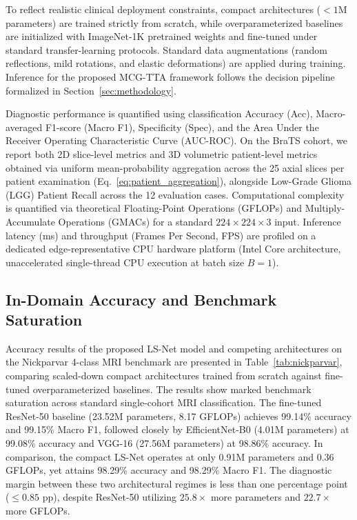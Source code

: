 To reflect realistic clinical deployment constraints, compact architectures ($<1$M parameters) are trained strictly from scratch, while overparameterized baselines are initialized with ImageNet-1K pretrained weights and fine-tuned under standard transfer-learning protocols. Standard data augmentations (random reflections, mild rotations, and elastic deformations) are applied during training. Inference for the proposed MCG-TTA framework follows the decision pipeline formalized in Section~\ref{sec:methodology}.

Diagnostic performance is quantified using classification Accuracy (Acc), Macro-averaged F1-score (Macro F1), Specificity (Spec), and the Area Under the Receiver Operating Characteristic Curve (AUC-ROC). On the BraTS cohort, we report both 2D slice-level metrics and 3D volumetric patient-level metrics obtained via uniform mean-probability aggregation across the 25 axial slices per patient examination (Eq.~\ref{eq:patient_aggregation}), alongside Low-Grade Glioma (LGG) Patient Recall across the 12 evaluation cases. Computational complexity is quantified via theoretical Floating-Point Operations (GFLOPs) and Multiply-Accumulate Operations (GMACs) for a standard $224 \times 224 \times 3$ input. Inference latency (ms) and throughput (Frames Per Second, FPS) are profiled on a dedicated edge-representative CPU hardware platform (Intel Core architecture, unaccelerated single-thread CPU execution at batch size $B=1$).

\subsection{In-Domain Accuracy and Benchmark Saturation}

Accuracy results of the proposed LS-Net model and competing architectures on the Nickparvar 4-class MRI benchmark are presented in Table~\ref{tab:nickparvar}, comparing scaled-down compact architectures trained from scratch against fine-tuned overparameterized baselines. The results show marked benchmark saturation across standard single-cohort MRI classification. The fine-tuned ResNet-50 baseline (23.52M parameters, 8.17 GFLOPs) achieves 99.14\% accuracy and 99.15\% Macro F1, followed closely by EfficientNet-B0 (4.01M parameters) at 99.08\% accuracy and VGG-16 (27.56M parameters) at 98.86\% accuracy. In comparison, the compact LS-Net operates at only 0.91M parameters and 0.36 GFLOPs, yet attains 98.29\% accuracy and 98.29\% Macro F1. The diagnostic margin between these two architectural regimes is less than one percentage point ($\le 0.85$ pp), despite ResNet-50 utilizing $25.8\times$ more parameters and $22.7\times$ more GFLOPs.

